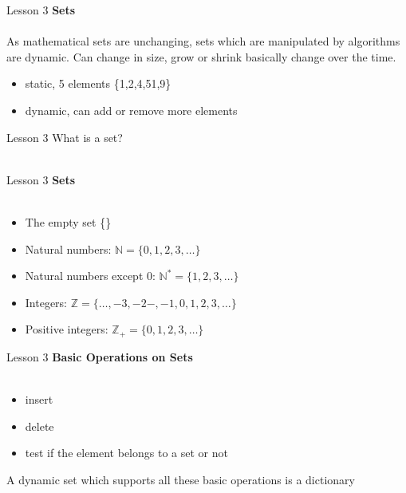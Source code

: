 \documentclass[aspectratio=1610]{beamer}
\begin{document}
\begin{frame}{Lesson 3}{}
\LARGE
\textbf{Sets}\\~\\
As mathematical sets are unchanging, sets which are manipulated by algorithms are dynamic. Can change in size, grow or shrink basically change over the time. 

\begin{itemize}
    \item static, 5 elements \{1,2,4,51,9\}
    \item dynamic, can add or remove more elements
\end{itemize}

\end{frame}



\begin{frame}{Lesson 3}{}
\Huge{What is a set?}\\~\\
\end{frame}


\begin{frame}{Lesson 3}{}
\LARGE
\textbf{Sets}\\~\\
\begin{itemize}
    \item The empty set \{\}
    \item Natural numbers: $\mathbb{N} = \{0, 1, 2, 3, \ldots\}$
    \item Natural numbers except 0: $\mathbb{N^*} = \{1, 2, 3, \ldots\}$
    \item Integers: $\mathbb{Z} = \{\ldots, -3, -2-, -1, 0, 1, 2, 3, \ldots\}$
    \item Positive integers: $\mathbb{Z_+} = \{0, 1, 2, 3, \ldots\}$
\end{itemize}
\end{frame}


\begin{frame}{Lesson 3}{}
\LARGE
\textbf{Basic Operations on Sets}\\~\\
\begin{itemize}
    \item insert
    \item delete
    \item test if the element belongs to a set or not 
\end{itemize}

A dynamic set which supports all these basic operations is a dictionary
\end{frame}
\end{document}
